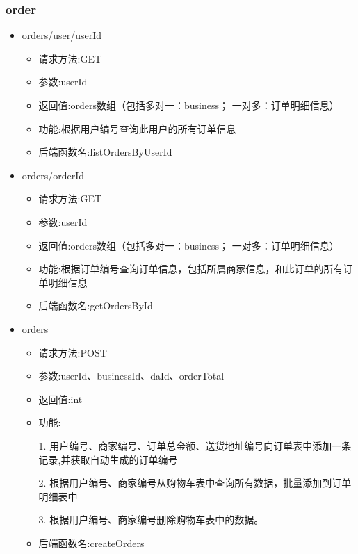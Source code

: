 \subsubsection*{order}
\begin{itemize}
\item orders/user/{userId}
\begin{itemize}
    \item 请求方法:GET
    \item 参数:userId
    \item 返回值:orders数组（包括多对一：business； 一对多：订单明细信息）
    \item 功能:根据用户编号查询此用户的所有订单信息
    \item 后端函数名:listOrdersByUserId
\end{itemize}

\item orders/{orderId}
\begin{itemize}
    \item 请求方法:GET
    \item 参数:userId
    \item 返回值:orders数组（包括多对一：business； 一对多：订单明细信息）
    \item 功能:根据订单编号查询订单信息，包括所属商家信息，和此订单的所有订单明细信息
    \item 后端函数名:getOrdersById
\end{itemize}

\item orders
\begin{itemize}
    \item 请求方法:POST
    \item 参数:userId、businessId、daId、orderTotal
    \item 返回值:int
    \item 功能:\par
        1. 用户编号、商家编号、订单总金额、送货地址编号向订单表中添加一条记录,并获取自动生成的订单编号\par
         2. 根据用户编号、商家编号从购物车表中查询所有数据，批量添加到订单明细表中\par
        3. 根据用户编号、商家编号删除购物车表中的数据。
    \item 后端函数名:createOrders
\end{itemize}
\end{itemize}

